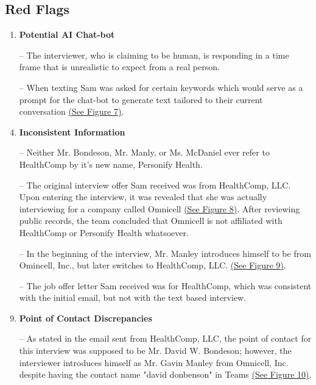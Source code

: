 \begin{fullwidth}
\section{Red Flags} %
\begin{enumerate}
    \item \textbf{Potential AI Chat-bot}
            \\\medskip
                \item[--] The interviewer, who is claiming to be human, is responding in a time frame that is unrealistic to expect from a real person.
            \\\medskip
                \item[--] When texting Sam was asked for certain keywords which would serve as a prompt for the chat-bot to generate text tailored to their current conversation \hyperref[sec:Fig7]{(See Figure 7)}.
            \\\medskip
    \item \textbf{Inconsistent Information}
            \\\medskip
                \item[--] Neither Mr. Bondeson, Mr. Manly, or Ms. McDaniel ever refer to HealthComp by it's new name, Personify Health.
            \\\medskip
                \item[--] The original interview offer Sam received was from HealthComp, LLC. Upon entering the interview, it was revealed that she was actually interviewing for a company called Omnicell \hyperref[sec:Fig8]{(See Figure 8)}. After reviewing public records, the team concluded that Omnicell is not affiliated with HealthComp or Personify Health whatsoever.
            \\\medskip
                \item[--] In the beginning of the interview, Mr. Manley introduces himself to be from Omincell, Inc., but  later switches to HealthComp, LLC. \hyperref[sec:Fig9]{(See Figure 9)}.
            \\\medskip
                \item[--] The job offer letter Sam received was for HealthComp, which was consistent with the initial email, but not with the text based interview.
    \item \textbf{Point of Contact Discrepancies}
            \\\medskip
                \item[--] As stated in the email sent from HealthComp, LLC, the point of contact for this interview was supposed to be Mr. David W. Bondeson; however, the interviewer introduces himself as Mr. Gavin Manley from Omnicell, Inc. despite having the contact name "david donbenson" in Teams \hyperref[sec:Fig10]{(See Figure 10)}.

\end{enumerate}
\end{fullwidth}
